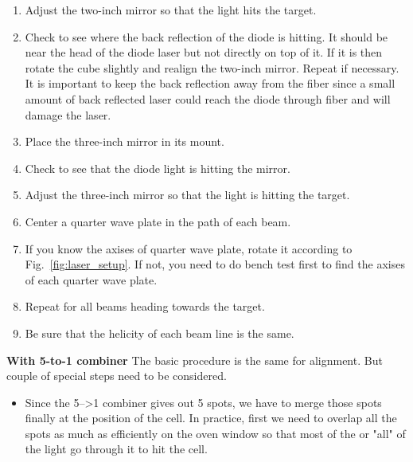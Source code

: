 {\begin{enumerate}
\begin{itemize}
\item Rotate the quarter wave plate forty-five degrees.
\end{itemize}
\item Adjust the two-inch mirror so that the light hits the target.
\item Check to see where the back reflection of the diode is hitting. It
  should be near the head of the diode laser but not directly on top of
  it. If it is then rotate the cube slightly and realign the two-inch
  mirror. Repeat if necessary.  It is important to keep the back reflection
  away from the fiber since a small amount of back reflected laser could reach 
  the diode through fiber and will damage the laser.
\item Place the three-inch mirror in its mount.
\item Check to see that the diode light is hitting the mirror.
\item Adjust the three-inch mirror so that the light is hitting the
  target.
\item Center a quarter wave plate in the path of each beam.
\item If you know the axises of quarter wave plate, rotate it according to 
      Fig.~\ref{fig:laser_setup}.  If not, you need to do bench test first to 
      find the axises of each quarter wave plate.
\item Repeat for all beams heading towards the target.
\item Be sure that the helicity of each beam line is the same.
\end{enumerate}

\medskip
\noindent
{\bf{With 5-to-1 combiner}}
The basic procedure is the same for alignment. But couple of special
steps need to be considered.

\begin{itemize}
\item Since the 5-->1 combiner gives out 5 spots, we have to merge those
spots finally at the position of the cell. In practice, first we need to
overlap all the spots as much as efficiently on the oven window so that
most of the or "all" of the light go through it to hit the cell.


\end{itemize}}
